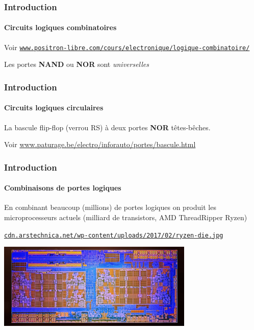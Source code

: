 \documentclass[xcolor=svgnames,final,smaller,a4]{beamer}
\begin{document}
\begin{frame}
  \frametitle{Introduction}
  \framesubtitle{Circuits logiques combinatoires}

Voir \href{https://www.positron-libre.com/cours/electronique/logique-combinatoire/}{\texttt{www.positron-libre.com/cours/electronique/logique-combinatoire/}}

\vspace{5cm}

Les portes \textbf{NAND} ou \textbf{NOR} sont \textit{universelles}

\end{frame}


\begin{frame}
  \frametitle{Introduction}
  \framesubtitle{Circuits logiques circulaires}

La bascule flip-flop (verrou RS) à deux portes  \textbf{NOR} têtes-bêches. 
\vspace{5cm}

Voir \href{http://www.paturage.be/electro/inforauto/portes/bascule.html}{www.paturage.be/electro/inforauto/portes/bascule.html}

\end{frame}



\begin{frame}
  \frametitle{Introduction}
  \framesubtitle{Combinaisons de portes logiques}

En combinant beaucoup (millions) de portes logiques on produit les microprocesseurs actuels (milliard de transistors, 
AMD ThreadRipper Ryzen)

\vspace{0.5cm}

 \href{https://cdn.arstechnica.net/wp-content/uploads/2017/02/ryzen-die.jpg}{\texttt{cdn.arstechnica.net/wp-content/uploads/2017/02/ryzen-die.jpg}}

 \vspace{0.5cm}
 \includegraphics[width=0.7\textwidth]{ryzen-die.jpg}

\end{frame}
\end{document}
